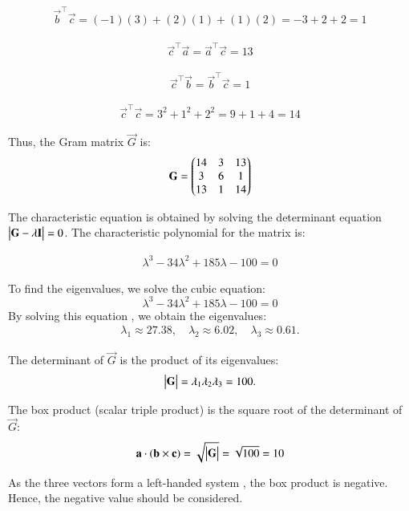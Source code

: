 \documentclass[journal,12pt,onecolumn]{IEEEtran}
\theoremstyle{remark}
\begin{document}
\begin{align}
\vec{b}^\top \vec{c} = (-1)(3) + (2)(1) + (1)(2) = -3 + 2 + 2 = 1
\end{align}

\begin{align}
\vec{c}^\top \vec{a} = \vec{a}^\top \vec{c} = 13
\end{align}

\begin{align}
\vec{c}^\top \vec{b} = \vec{b}^\top \vec{c} = 1
\end{align}

\begin{align}
\vec{c}^\top \vec{c} = 3^2 + 1^2 + 2^2 = 9 + 1 + 4 = 14
\end{align}

Thus, the Gram matrix \( \vec{G} \) is:
\begin{align}
\vec{G} = \myvec{
14 & 3 & 13 \\
3 & 6 & 1 \\
13 & 1 & 14
}
\end{align}

The characteristic equation is obtained by solving the determinant equation \( \mydet{\vec{G} - \lambda \vec{I}} = 0 \). The characteristic polynomial for the matrix is:

\begin{align}
\lambda^3 - 34\lambda^2 + 185\lambda - 100 = 0
\end{align}


To find the eigenvalues, we solve the cubic equation:
\[
\lambda^3 - 34\lambda^2 + 185\lambda - 100 = 0
\]
By solving this equation , we obtain the eigenvalues:
\begin{align}
\lambda_1 \approx 27.38, \quad \lambda_2 \approx 6.02, \quad \lambda_3 \approx 0.61.
\end{align}


The determinant of \( \vec{G} \) is the product of its eigenvalues:
\begin{align}
\mydet{\vec{G}} = \lambda_1 \lambda_2 \lambda_3 = 100.
\end{align}


The box product (scalar triple product) is the square root of the determinant of \( \vec{G} \):
\begin{align}
\vec{a} \cdot (\vec{b} \times \vec{c}) = \sqrt{\mydet{\vec{G}}} = \sqrt{100} = 10
\end{align}

As the three vectors form a left-handed system , the box product is negative. Hence, the negative value should be considered.
\end{document}

